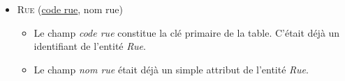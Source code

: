 \documentclass[a4paper]{article}
\newcommand{\relat}[1]{\textsc{#1}}
\newcommand{\attr}[1]{#1}
\newcommand{\prim}[1]{\uline{#1}}
\begin{document}
\begin{itemize}
  \item \relat{Rue} (\prim{code rue}, \attr{nom rue})
  \begin{itemize}
    \item Le champ \emph{code rue} constitue la clé primaire de la table. C'était déjà un identifiant de l'entité \emph{Rue}.
    \item Le champ \emph{nom rue} était déjà un simple attribut de l'entité \emph{Rue}.
  \end{itemize}

\end{itemize}
\end{document}
